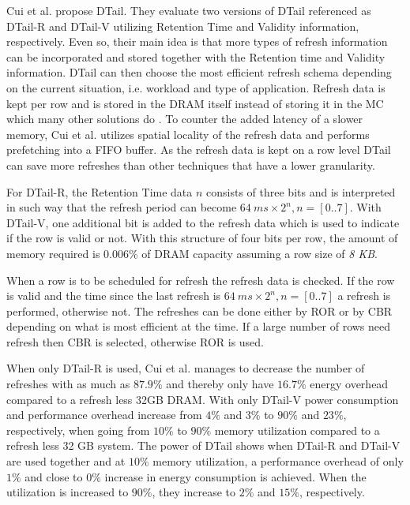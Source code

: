 Cui et al. \cite{dtail} propose DTail. They evaluate two versions of DTail referenced as DTail-R and DTail-V utilizing Retention Time and Validity information, respectively. Even so, their main idea is that more types of refresh information can be incorporated and stored together with the Retention time and Validity information. DTail can then choose the most efficient refresh schema depending on the current situation, i.e. workload and type of application. Refresh data is kept per row and is stored in the DRAM itself instead of storing it in the MC which many other solutions do \cite{raidr}\cite{smartrefresh}\cite{refrint}. To counter the added latency of a slower memory, Cui et al. utilizes spatial locality of the refresh data and performs prefetching into a FIFO buffer. As the refresh data is kept on a row level DTail can save more refreshes than other techniques that have a lower granularity.

For DTail-R, the Retention Time data $n$ consists of three bits and is interpreted in such way that the refresh period can become \(64\:ms \times 2^n, n = [0..7]\). With DTail-V, one additional bit is added to the refresh data which is used to indicate if the row is valid or not. With this structure of four bits per row, the amount of memory required is $0.006\%$ of DRAM capacity assuming a row size of \textit{8 KB}. 

When a row is to be scheduled for refresh the refresh data is checked. If the row is valid and the time since the last refresh is \(64\:ms \times 2^n, n = [0..7]\) a refresh is performed, otherwise not. The refreshes can be done either by ROR or by CBR depending on what is most efficient at the time. If a large number of rows need refresh then CBR is selected, otherwise ROR is used. 

When only DTail-R is used, Cui et al. manages to decrease the number of refreshes with as much as $87.9\%$ and thereby only have $16.7\%$ energy overhead compared to a refresh less 32GB DRAM. With only DTail-V power consumption and performance overhead increase from $4\%$ and $3\%$ to $90\%$ and $23\%$, respectively, when going from $10\%$ to $90\%$ memory utilization compared to a refresh less 32 GB system. The power of DTail shows when DTail-R and DTail-V are used together and at $10\%$ memory utilization, a performance overhead of only $1\%$ and close to $0\%$ increase in energy consumption is achieved. When the utilization is increased to $90\%$, they increase to $2\%$ and $15\%$, respectively.